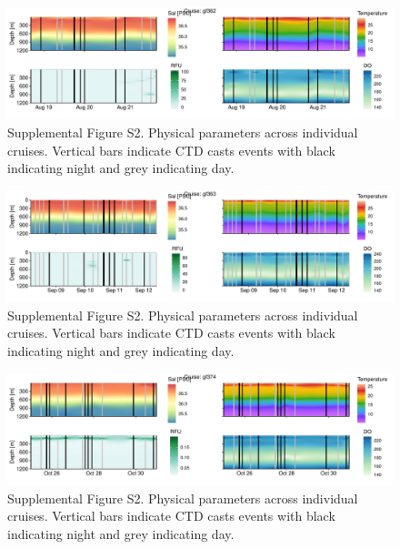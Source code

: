 \documentclass[
]{article}
\begin{document}
\begin{figure}

{\centering \includegraphics[width=1\textwidth,height=\textheight]{index_files/figure-pdf/unnamed-chunk-19-3.pdf}

}

\caption{Supplemental Figure S2. Physical parameters across individual
cruises. Vertical bars indicate CTD casts events with black indicating
night and grey indicating day.}

\end{figure}

\begin{figure}

{\centering \includegraphics[width=1\textwidth,height=\textheight]{index_files/figure-pdf/unnamed-chunk-19-4.pdf}

}

\caption{Supplemental Figure S2. Physical parameters across individual
cruises. Vertical bars indicate CTD casts events with black indicating
night and grey indicating day.}

\end{figure}

\begin{figure}

{\centering \includegraphics[width=1\textwidth,height=\textheight]{index_files/figure-pdf/unnamed-chunk-19-5.pdf}

}

\caption{Supplemental Figure S2. Physical parameters across individual
cruises. Vertical bars indicate CTD casts events with black indicating
night and grey indicating day.}

\end{figure}
\end{document}
